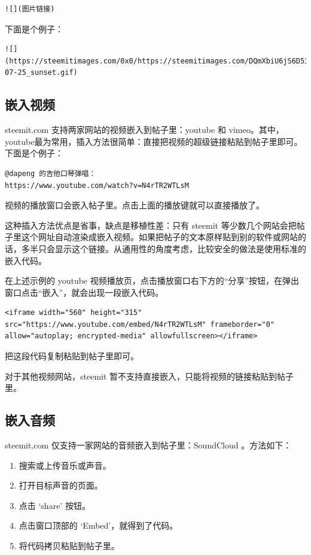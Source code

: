 \documentclass[]{ctexbook}
\providecommand{\tightlist}{%
  \setlength{\itemsep}{0pt}\setlength{\parskip}{0pt}}
\begin{document}
\begin{verbatim}
![](图片链接)
\end{verbatim}

下面是个例子：

\begin{verbatim}
![](https://steemitimages.com/0x0/https://steemitimages.com/DQmXbiU6jS6D53RA2sUDX63K2511ENqzJUe3ak81dwf3v56/2017-07-25_sunset.gif)
\end{verbatim}

\subsection{嵌入视频}

steemit.com 支持两家网站的视频嵌入到帖子里：youtube 和 vimeo。其中，youtube最为常用，插入方法很简单：直接把视频的超级链接粘贴到帖子里即可。下面是个例子：

\begin{verbatim}
@dapeng 的吉他口琴弹唱：
https://www.youtube.com/watch?v=N4rTR2WTLsM
\end{verbatim}

视频的播放窗口会嵌入帖子里。点击上面的播放键就可以直接播放了。

这种插入方法优点是省事，缺点是移植性差：只有 steemit 等少数几个网站会把帖子里这个网址自动渲染成嵌入视频。如果把帖子的文本原样贴到别的软件或网站的话，多半只会显示这个链接。从通用性的角度考虑，比较安全的做法是使用标准的嵌入代码。

在上述示例的 youtube 视频播放页，点击播放窗口右下方的``分享''按钮，在弹出窗口点击``嵌入''，就会出现一段嵌入代码。

\begin{verbatim}
<iframe width="560" height="315" src="https://www.youtube.com/embed/N4rTR2WTLsM" frameborder="0" allow="autoplay; encrypted-media" allowfullscreen></iframe>
\end{verbatim}

把这段代码复制粘贴到帖子里即可。

对于其他视频网站，steemit 暂不支持直接嵌入，只能将视频的链接粘贴到帖子里。

\subsection{嵌入音频}

steemit.com 仅支持一家网站的音频嵌入到帖子里：SoundCloud 。方法如下：

\begin{enumerate}
\def\labelenumi{\arabic{enumi}.}
\tightlist
\item
  搜索或上传音乐或声音。
\item
  打开目标声音的页面。
\item
  点击 `share' 按钮。
\item
  点击窗口顶部的 `Embed'，就得到了代码。
\item
  将代码拷贝粘贴到帖子里。
\end{enumerate}
\end{document}
